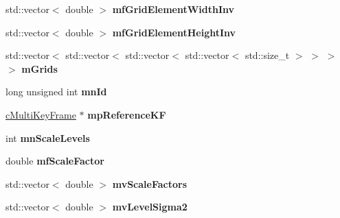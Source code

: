 \begin{DoxyCompactItemize}
\item 
std\+::vector$<$ double $>$ {\bfseries mf\+Grid\+Element\+Width\+Inv}\hypertarget{classMultiColSLAM_1_1cMultiFrame_a309c0181a04323c1b1a4aae7cb507551}{}\label{classMultiColSLAM_1_1cMultiFrame_a309c0181a04323c1b1a4aae7cb507551}

\item 
std\+::vector$<$ double $>$ {\bfseries mf\+Grid\+Element\+Height\+Inv}\hypertarget{classMultiColSLAM_1_1cMultiFrame_a4d4a68a7c54e5db5dfd57888d949fc8f}{}\label{classMultiColSLAM_1_1cMultiFrame_a4d4a68a7c54e5db5dfd57888d949fc8f}

\item 
std\+::vector$<$ std\+::vector$<$ std\+::vector$<$ std\+::vector$<$ std\+::size\+\_\+t $>$ $>$ $>$ $>$ {\bfseries m\+Grids}\hypertarget{classMultiColSLAM_1_1cMultiFrame_ace3a3ae8bc5a4e057175da26d756336a}{}\label{classMultiColSLAM_1_1cMultiFrame_ace3a3ae8bc5a4e057175da26d756336a}

\item 
long unsigned int {\bfseries mn\+Id}\hypertarget{classMultiColSLAM_1_1cMultiFrame_a06614a7fc08870329309c96397041484}{}\label{classMultiColSLAM_1_1cMultiFrame_a06614a7fc08870329309c96397041484}

\item 
\hyperlink{classMultiColSLAM_1_1cMultiKeyFrame}{c\+Multi\+Key\+Frame} $\ast$ {\bfseries mp\+Reference\+KF}\hypertarget{classMultiColSLAM_1_1cMultiFrame_a1b91d5712736f5007722352b829c57ef}{}\label{classMultiColSLAM_1_1cMultiFrame_a1b91d5712736f5007722352b829c57ef}

\item 
int {\bfseries mn\+Scale\+Levels}\hypertarget{classMultiColSLAM_1_1cMultiFrame_afc3a90e6d6187ffc9074aea01de9a43f}{}\label{classMultiColSLAM_1_1cMultiFrame_afc3a90e6d6187ffc9074aea01de9a43f}

\item 
double {\bfseries mf\+Scale\+Factor}\hypertarget{classMultiColSLAM_1_1cMultiFrame_aa675a61319327fec482df9c27bedd926}{}\label{classMultiColSLAM_1_1cMultiFrame_aa675a61319327fec482df9c27bedd926}

\item 
std\+::vector$<$ double $>$ {\bfseries mv\+Scale\+Factors}\hypertarget{classMultiColSLAM_1_1cMultiFrame_a511d335e55baba101d5f1ae81f5788d2}{}\label{classMultiColSLAM_1_1cMultiFrame_a511d335e55baba101d5f1ae81f5788d2}

\item 
std\+::vector$<$ double $>$ {\bfseries mv\+Level\+Sigma2}\hypertarget{classMultiColSLAM_1_1cMultiFrame_a91abff96f10c7c8ec5ca0d44bd32a3d6}{}\label{classMultiColSLAM_1_1cMultiFrame_a91abff96f10c7c8ec5ca0d44bd32a3d6}


\end{DoxyCompactItemize}
